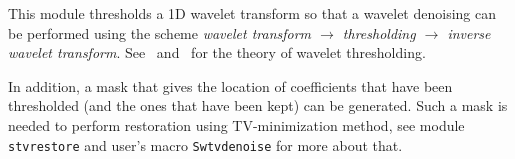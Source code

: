 This module thresholds a 1D wavelet transform so that a 
wavelet denoising can be performed using the scheme 
{\em wavelet transform $\rightarrow$ thresholding $\rightarrow$ inverse wavelet transform}.
See~\cite{donoho.johnstone:ideal} and~\cite{donoho:de-noising} for the theory of 
wavelet thresholding.

In addition, a mask that gives the location of coefficients
that have been thresholded (and the ones that have been kept) can be
generated. Such a mask is needed to perform restoration using TV-minimization
method, see module {\tt stvrestore} and user's macro {\tt Swtvdenoise} for
more about that.

